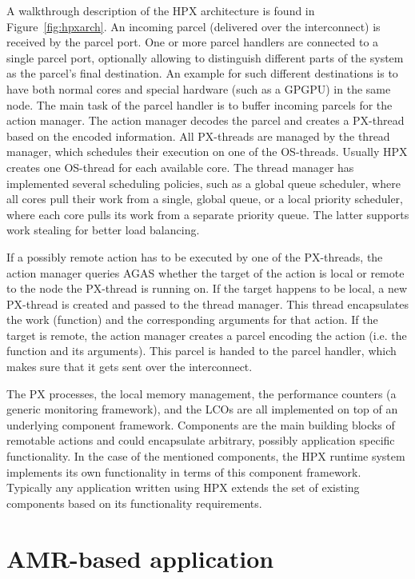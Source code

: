 \documentclass{revtex4}
\begin{document}
A walkthrough description of the HPX architecture is found in Figure~\ref{fig:hpxarch}.  An incoming parcel (delivered over the interconnect) is received by the parcel port. One or more 
parcel handlers are connected to a single parcel port, optionally allowing to distinguish different 
parts of the system as the parcel's final destination. An example for such different destinations 
is to have both normal cores and special hardware (such as a GPGPU) in the same node. The 
main task of the parcel handler is to buffer incoming parcels for the action manager. The action 
manager decodes the parcel and creates a PX-thread based on the encoded information. 
All PX-threads are managed by the thread manager, which schedules their execution on one 
of the OS-threads. Usually HPX creates one OS-thread for each available core. The thread 
manager has implemented several scheduling policies, such as a global queue scheduler, where all
cores pull their work from a single, global queue, or a local priority scheduler, where each core
pulls its work from a separate priority queue. The latter supports work stealing for better
load balancing.

If a possibly remote action has to be executed by one of the PX-threads, the action manager 
queries AGAS whether the target of the action is local or remote to the node the PX-thread 
is running on. If the target happens to be local, a new PX-thread is created and passed to the 
thread manager. This thread encapsulates the work (function) and the corresponding arguments 
for that action. If the target is remote, the action manager creates a parcel encoding the 
action (i.e. the function and its arguments). This parcel is handed to the parcel handler, which 
makes sure that it gets sent over the interconnect.

The PX processes, the local memory management, the performance counters (a generic monitoring 
framework), and the LCOs are all implemented on top of an underlying component framework. 
Components are the main building blocks of remotable actions and could encapsulate arbitrary, 
possibly application specific functionality. In the case of the mentioned components,
the HPX runtime system implements its own functionality in terms of this component framework.
Typically any application written using HPX extends the set of existing components based on
its functionality requirements.

\section{AMR-based application}
\label{sec:amr}
\end{document}
